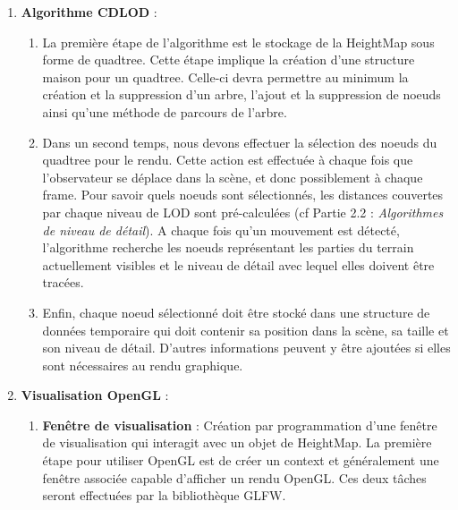\documentclass[12pt]{report}
\begin{document}
\begin{enumerate}
    \item \textbf{Algorithme CDLOD} :
    \begin{enumerate}
        \item La première étape de l'algorithme est le stockage de la HeightMap sous forme de quadtree. Cette étape implique la création d'une structure maison pour un quadtree. Celle-ci devra permettre au minimum la création et la suppression d'un arbre, l'ajout et la suppression de noeuds ainsi qu'une méthode de parcours de l'arbre.
        \item Dans un second temps, nous devons effectuer la sélection des noeuds du quadtree pour le rendu. Cette action est effectuée à chaque fois que l'observateur se déplace dans la scène, et donc possiblement à chaque frame. Pour savoir quels noeuds sont sélectionnés, les distances couvertes par chaque niveau de LOD sont pré-calculées (cf Partie 2.2 : \textit{Algorithmes de niveau de détail}). A chaque fois qu'un mouvement est détecté, l'algorithme recherche les noeuds représentant les parties du terrain actuellement visibles et le niveau de détail avec lequel elles doivent être tracées.
        \item Enfin, chaque noeud sélectionné doit être stocké dans une structure de données temporaire qui doit contenir sa position dans la scène, sa taille et son niveau de détail. D'autres informations peuvent y être ajoutées si elles sont nécessaires au rendu graphique.
    \end{enumerate}

    \item \textbf{Visualisation OpenGL} :
    \begin{enumerate}
        \item \textbf{Fenêtre de visualisation} : 
            Création par programmation d'une fenêtre de visualisation qui interagit avec un objet de HeightMap. La première étape pour utiliser OpenGL est de créer un context et généralement une fenêtre associée capable d'afficher un rendu OpenGL. Ces deux tâches seront effectuées par la bibliothèque GLFW.
            

\end{enumerate}
\end{enumerate}
\end{document}

